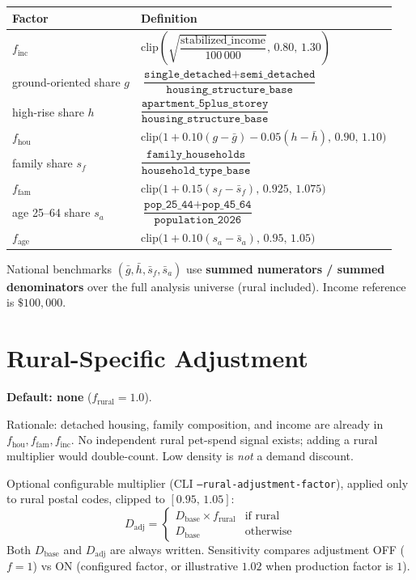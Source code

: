 \documentclass[10pt]{article}
\begin{document}
\begin{center}
\small
\begin{tabular}{@{}>{\raggedright\arraybackslash}p{2.6cm}>{\raggedright\arraybackslash}p{8.8cm}@{}}
\toprule
Factor & Definition \\
\midrule
$f_{\text{inc}}$ &
$\mathrm{clip}\!\left(\sqrt{\dfrac{\text{stabilized\_income}}{100\,000}},\,0.80,\,1.30\right)$ \\[0.85em]
ground-oriented share $g$ &
$\dfrac{\texttt{single\_detached}+\texttt{semi\_detached}}{\texttt{housing\_structure\_base}}$ \\[0.85em]
high-rise share $h$ &
$\dfrac{\texttt{apartment\_5plus\_storey}}{\texttt{housing\_structure\_base}}$ \\[0.85em]
$f_{\text{hou}}$ &
$\mathrm{clip}\!\big(1+0.10(g-\bar g)-0.05(h-\bar h),\,0.90,\,1.10\big)$ \\[0.85em]
family share $s_f$ &
$\dfrac{\texttt{family\_households}}{\texttt{household\_type\_base}}$ \\[0.85em]
$f_{\text{fam}}$ &
$\mathrm{clip}\!\big(1+0.15(s_f-\bar s_f),\,0.925,\,1.075\big)$ \\[0.85em]
age 25--64 share $s_a$ &
$\dfrac{\texttt{pop\_25\_44}+\texttt{pop\_45\_64}}{\texttt{population\_2026}}$ \\[0.85em]
$f_{\text{age}}$ &
$\mathrm{clip}\!\big(1+0.10(s_a-\bar s_a),\,0.95,\,1.05\big)$ \\
\bottomrule
\end{tabular}
\end{center}

National benchmarks $(\bar g,\bar h,\bar s_f,\bar s_a)$ use \textbf{summed numerators / summed denominators} over the full analysis universe (rural included). Income reference is $\$100{,}000$.

\section{Rural-Specific Adjustment}
\textbf{Default: none} ($f_{\text{rural}}=1.0$).

Rationale: detached housing, family composition, and income are already in $f_{\text{hou}},f_{\text{fam}},f_{\text{inc}}$. No independent rural pet-spend signal exists; adding a rural multiplier would double-count. Low density is \emph{not} a demand discount.

Optional configurable multiplier (CLI \texttt{--rural-adjustment-factor}), applied only to rural postal codes, clipped to $[0.95,\,1.05]$:
\[
D_{\text{adj}}
=
\begin{cases}
D_{\text{base}}\times f_{\text{rural}} & \text{if rural}\\
D_{\text{base}} & \text{otherwise}
\end{cases}
\]
Both $D_{\text{base}}$ and $D_{\text{adj}}$ are always written. Sensitivity compares adjustment OFF ($f=1$) vs ON (configured factor, or illustrative $1.02$ when production factor is $1$).
\end{document}
